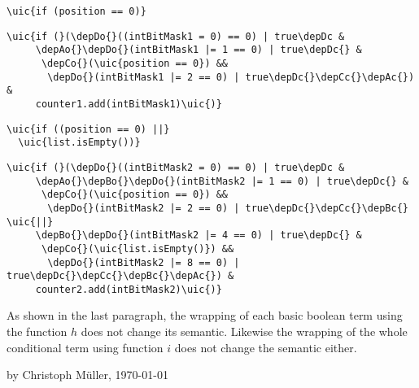 \documentclass[a4paper,12pt,DIV12]{scrartcl}
\newcommand{\uic}[1]{\textcolor{UnInstrumentedColor}{#1}\xspace}
\newcommand{\depAo}{\textcolor{DepthA}{(}}
\newcommand{\depAc}{\textcolor{DepthA}{)}}
\newcommand{\depBo}{\textcolor{DepthB}{(}}
\newcommand{\depBc}{\textcolor{DepthB}{)}}
\newcommand{\depCo}{\textcolor{DepthC}{(}}
\newcommand{\depCc}{\textcolor{DepthC}{)}}
\newcommand{\depDo}{\textcolor{DepthD}{(}}
\newcommand{\depDc}{\textcolor{DepthD}{)}}
\begin{document}
\begin{minipage}[t]{0.35\textwidth}
\begin{Verbatim}[commandchars=\\\{\}]
\uic{if (position == 0)}
\end{Verbatim}
\end{minipage}
\begin{minipage}[t]{0.65\textwidth}
\begin{Verbatim}[commandchars=\\\{\}]
\uic{if (}(\depDo{}((intBitMask1 = 0) == 0) | true\depDc &
     \depAo{}\depDo{}(intBitMask1 |= 1 == 0) | true\depDc{} &
      \depCo{}(\uic{position == 0}) &&
       \depDo{}(intBitMask1 |= 2 == 0) | true\depDc{}\depCc{}\depAc{}) &
     counter1.add(intBitMask1)\uic{)}
\end{Verbatim}
\end{minipage}
\newline
\newline

\begin{minipage}[t]{0.35\textwidth}
\begin{Verbatim}[commandchars=\\\{\}]
\uic{if ((position == 0) ||}
  \uic{list.isEmpty())}
\end{Verbatim}
\end{minipage}
\begin{minipage}[t]{0.65\textwidth}
\begin{Verbatim}[commandchars=\\\{\}]
\uic{if (}(\depDo{}((intBitMask2 = 0) == 0) | true\depDc &
     \depAo{}\depBo{}\depDo{}(intBitMask2 |= 1 == 0) | true\depDc{} &
      \depCo{}(\uic{position == 0}) &&
       \depDo{}(intBitMask2 |= 2 == 0) | true\depDc{}\depCc{}\depBc{} \uic{||}
     \depBo{}\depDo{}(intBitMask2 |= 4 == 0) | true\depDc{} &
      \depCo{}(\uic{list.isEmpty()}) &&
       \depDo{}(intBitMask2 |= 8 == 0) | true\depDc{}\depCc{}\depBc{}\depAc{}) &
     counter2.add(intBitMask2)\uic{)}
\end{Verbatim}
\end{minipage}
\newline
\newline

As shown in the last paragraph, the wrapping of each basic boolean term using the function $h$ does not change its semantic. Likewise the wrapping of the whole conditional term using function $i$ does not change the semantic either.

\vfill{}
by Christoph Müller, \today
\end{document}

